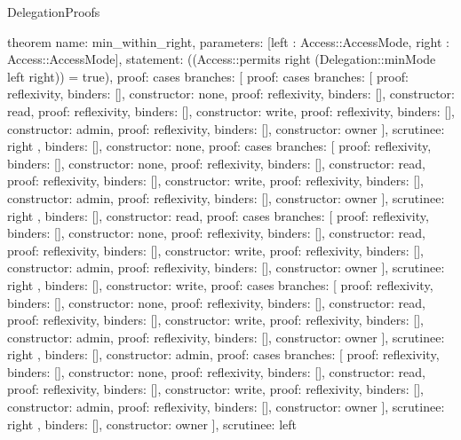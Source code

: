 \begin{lexlean}{DelegationProofs}
\begin{semanticmodule}
theorem{
  name: min_within_right,
  parameters: [left : Access::AccessMode, right : Access::AccessMode],
  statement: ((Access::permits right (Delegation::minMode left right)) = true),
  proof: cases{
    branches: [
      {proof: cases{
        branches: [
          {proof: reflexivity{}, binders: [], constructor: none},
          {proof: reflexivity{}, binders: [], constructor: read},
          {proof: reflexivity{}, binders: [], constructor: write},
          {proof: reflexivity{}, binders: [], constructor: admin},
          {proof: reflexivity{}, binders: [], constructor: owner}
        ],
        scrutinee: right
      }, binders: [], constructor: none},
      {proof: cases{
        branches: [
          {proof: reflexivity{}, binders: [], constructor: none},
          {proof: reflexivity{}, binders: [], constructor: read},
          {proof: reflexivity{}, binders: [], constructor: write},
          {proof: reflexivity{}, binders: [], constructor: admin},
          {proof: reflexivity{}, binders: [], constructor: owner}
        ],
        scrutinee: right
      }, binders: [], constructor: read},
      {proof: cases{
        branches: [
          {proof: reflexivity{}, binders: [], constructor: none},
          {proof: reflexivity{}, binders: [], constructor: read},
          {proof: reflexivity{}, binders: [], constructor: write},
          {proof: reflexivity{}, binders: [], constructor: admin},
          {proof: reflexivity{}, binders: [], constructor: owner}
        ],
        scrutinee: right
      }, binders: [], constructor: write},
      {proof: cases{
        branches: [
          {proof: reflexivity{}, binders: [], constructor: none},
          {proof: reflexivity{}, binders: [], constructor: read},
          {proof: reflexivity{}, binders: [], constructor: write},
          {proof: reflexivity{}, binders: [], constructor: admin},
          {proof: reflexivity{}, binders: [], constructor: owner}
        ],
        scrutinee: right
      }, binders: [], constructor: admin},
      {proof: cases{
        branches: [
          {proof: reflexivity{}, binders: [], constructor: none},
          {proof: reflexivity{}, binders: [], constructor: read},
          {proof: reflexivity{}, binders: [], constructor: write},
          {proof: reflexivity{}, binders: [], constructor: admin},
          {proof: reflexivity{}, binders: [], constructor: owner}
        ],
        scrutinee: right
      }, binders: [], constructor: owner}
    ],
    scrutinee: left
  }
}
\end{semanticmodule}
\end{lexlean}
